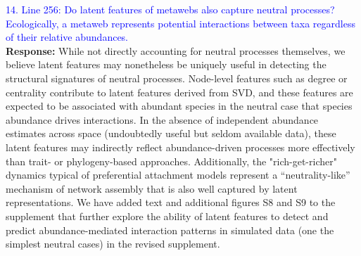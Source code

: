 \documentclass{article}
\begin{document}
\textcolor{blue}{14. Line 256: Do latent features of metawebs also capture neutral processes? Ecologically, a metaweb represents potential interactions between taxa regardless of their relative abundances.} \\
\textbf{Response:} While not directly accounting for neutral processes themselves, we believe latent features may nonetheless be uniquely useful in detecting the structural signatures of neutral processes. Node-level features such as degree or centrality contribute to latent features derived from SVD, and these features are expected to be associated with abundant species in the neutral case that species abundance drives interactions. In the absence of independent abundance estimates across space (undoubtedly useful but seldom available data), these latent features may indirectly reflect abundance-driven processes more effectively than trait- or phylogeny-based approaches. Additionally, the "rich-get-richer" dynamics typical of preferential attachment models \cite{barabasi1999emergence} represent a “neutrality-like” mechanism of network assembly that is also well captured by latent representations. We have added text and additional figures S8 and S9 to the supplement that further explore the ability of latent features to detect and predict abundance-mediated interaction patterns in simulated data (one the simplest neutral cases) in the revised supplement. 
\end{document}
